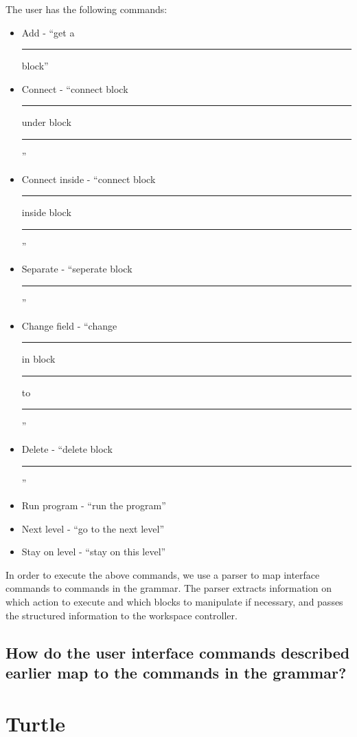 \documentclass[]{article}
\newcommand{\uline}[1]{\rule[0pt]{#1}{0.4pt}}
\begin{document}
The user has the following commands: 
\begin{itemize}
  \item Add  - ``get a \uline{1cm} block''
  \item Connect - ``connect block \uline{.5cm} under block \uline{.5cm}''
  \item Connect inside - ``connect block \uline{.5cm} inside block \uline{.5cm}''
  \item Separate - ``seperate block \uline{.5cm}''
  \item Change field - ``change \uline{.5cm} in block \uline{.5cm} to \uline{.5cm}''
  \item Delete - ``delete block \uline{.5cm}''
  \item Run program - ``run the program''
  \item Next level - ``go to the next level''
  \item Stay on level - ``stay on this level''
\end{itemize}

In order to execute the above commands, we use a parser to map interface commands to commands in the grammar. The parser extracts information on which action to execute and which blocks to manipulate if necessary, and passes the structured information to the workspace controller.
\subsection{How do the user interface commands described earlier map to the commands in the grammar?}

\section{Turtle}

\end{document}
